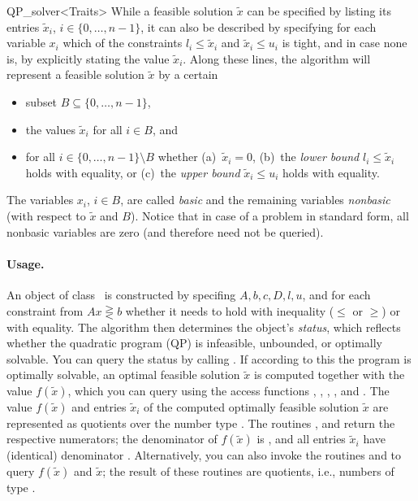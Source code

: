 \begin{ccRefClass}{QP_solver<Traits>}
While a feasible solution $\tilde{x}$ can be specified by listing its
entries $\tilde{x}_i$, $i\in\{0,\ldots,n-1\}$, it can also be
described by specifying for each variable $x_i$ which of the
constraints $l_i\leq \tilde{x}_i$ and $\tilde{x}_i\leq u_i$ is tight,
and in case none is, by explicitly stating the value $\tilde{x}_i$.
Along these lines, the algorithm will represent a feasible solution
$\tilde{x}$ by a certain
\begin{itemize}
\item subset $B\subseteq \{0,\ldots,n-1\}$,
\item the values $\tilde{x}_i$ for all $i\in B$, and
\item for all $i\in \{0,\ldots,n-1\}\setminus B$ whether
(a)~$\tilde{x}_i=0$, (b)~the \emph{lower bound} $l_i \leq \tilde{x}_i$
holds with equality, or (c)~the \emph{upper bound} $\tilde{x}_i\leq
u_i$ holds with equality.
\end{itemize}
The variables $x_i$, $i\in B$, are called \emph{basic} and the
remaining variables \emph{nonbasic} (with respect to $\tilde{x}$ and
$B$).  Notice that in case of a problem in standard form, all nonbasic
variables are zero (and therefore need not be queried).

\paragraph{Usage.}
An object of class \ccRefName\ is constructed by specifing $A, b, c,
D, l, u$, and for each constraint from $Ax \gtreqless b$ whether it
needs to hold with inequality ($\leq$ or $\geq$) or with equality.
The algorithm then determines the object's \emph{status}, which
reflects whether the quadratic program (QP) is infeasible, unbounded,
or optimally solvable.  You can query the status by calling
.  If according to this the program is optimally
solvable, an optimal feasible solution $\tilde{x}$ is computed
together with the value $f(\tilde{x})$, which you can query using the
access functions ,
,
,
, and
.  The value $f(\tilde{x})$ and
entries $\tilde{x}_i$ of the computed optimally
feasible solution $\tilde{x}$ are represented as quotients over the
number type .  The routines
,
 and
 return the
respective numerators; the denominator of $f(\tilde{x})$ is
, and all entries $\tilde{x}_i$ have
(identical) denominator .
Alternatively, you can also invoke the routines  and
 to query $f(\tilde{x})$ and $\tilde{x}$;
the result of these routines are quotients, i.e., numbers of type
.



\end{ccRefClass}
